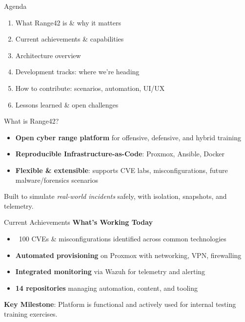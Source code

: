\documentclass[aspectratio=169]{beamer}
\begin{document}
\begin{frame}{Agenda}
  \begin{enumerate}
    \item What Range42 is \& why it matters
    \item Current achievements \& capabilities
    \item Architecture overview
    \item Development tracks: where we're heading
    \item How to contribute: scenarios, automation, UI/UX
    \item Lessons learned \& open challenges
  \end{enumerate}
\end{frame}

\begin{frame}{What is Range42?}
  \begin{itemize}
    \item \textbf{Open cyber range platform} for offensive, defensive, and hybrid training
    \item \textbf{Reproducible Infrastructure-as-Code}: Proxmox, Ansible, Docker
    \item \textbf{Flexible \& extensible}: supports CVE labs, misconfigurations, future malware/forensics scenarios
  \end{itemize}
  \begin{tcolorbox}
    \faInfoCircle\; Built to simulate \emph{real-world incidents} safely, with isolation, snapshots, and telemetry.
  \end{tcolorbox}
\end{frame}

\begin{frame}{Current Achievements \; \faCheckCircle}
  \textbf{What's Working Today}
  \begin{itemize}
    \item \alert{~100 CVEs \& misconfigurations identified} across common technologies
    \item \textbf{Automated provisioning} on Proxmox with networking, VPN, firewalling
    \item \textbf{Integrated monitoring} via Wazuh for telemetry and alerting
    \item \textbf{14 repositories} managing automation, content, and tooling
  \end{itemize}
  \vspace{2mm}
  \begin{tcolorbox}
    \faLightbulb\; \textbf{Key Milestone}: Platform is functional and actively used for internal testing training exercises.
  \end{tcolorbox}
\end{frame}
\end{document}
